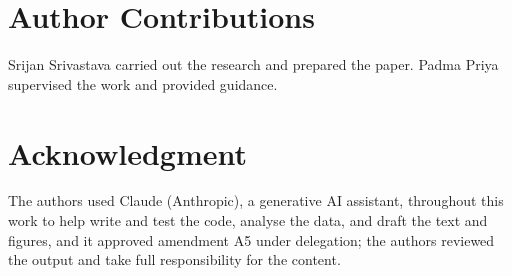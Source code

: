 \documentclass[conference,a4paper]{IEEEtran}
\begin{document}
\ifdefined\REVIEW\else
\section*{Author Contributions}
Srijan Srivastava carried out the research and prepared the paper. Padma Priya supervised the work and provided guidance.
\fi

\section*{Acknowledgment}
The authors used Claude (Anthropic), a generative AI assistant, throughout this work to help write and test the code, analyse the data, and draft the text and figures, and it approved amendment A5 under delegation; the authors reviewed the output and take full responsibility for the content.
\end{document}

